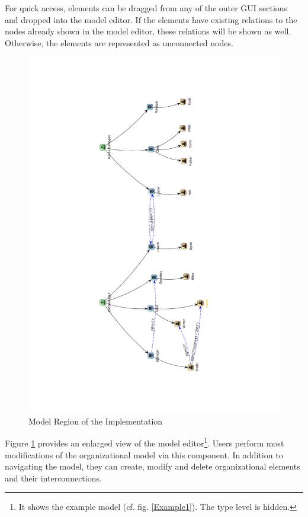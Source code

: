 For quick access, elements can be dragged from any of the outer GUI sections and dropped into the model editor. If the elements have existing relations to the nodes already shown in the model editor, these relations will be shown as well. Otherwise, the elements are represented as unconnected nodes.

\begin{figure}
\centering
\includegraphics[width=\textwidth]{Figures/corg-graph.pdf}
\caption{Model Region of the Implementation}
\label{proto-model}
\end{figure}

Figure \ref{proto-model} provides an enlarged view of the model editor\footnote{It shows the example model (cf. fig. \ref{Example1}). The type level is hidden.}.
Users perform most modifications of the organizational model via this component.
In addition to navigating the model, they can create, modify and delete organizational elements and their interconnections. 

